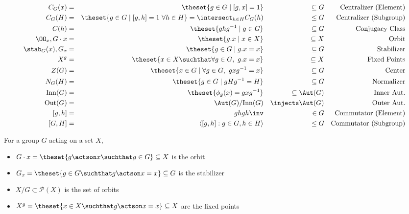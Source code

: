 \begin{align*}
C_G(x)          =       &&  \theset{g\in G \mid [g, x] = 1}                 &&  \subseteq G       &&  \text{Centralizer (Element)} \\
C_G(H)          =       &&  \theset{g\in G \mid [g, h] = 1 ~\forall h\in H} = \intersect_{h\in H} C_G(h)                 &&  \leq G       &&  \text{Centralizer (Subgroup)} \\
C(h)        =       &&  \theset{ghg^{-1} \mid g\in G}                     &&  \subseteq G       &&  \text{Conjugacy Class} \\
\OO_x, G\cdot x             =       &&  \theset{g.x \mid x\in X}                          &&  \subseteq X       &&  \text{Orbit} \\
\stab_G(x),  G_x            =       &&  \theset{g\in G \mid g.x = x}                      &&  \subseteq G       &&  \text{Stabilizer} \\
X^{g} = && \theset{x\in X \suchthat \forall g\in G,~ g.x = x} && \subseteq X && \text{Fixed Points} \\
Z(G)            =       &&  \theset{x\in G \mid \forall g\in G,~ gxg^{-1} = x} &&  \subseteq G       &&  \text{Center} \\
N_G(H)          =       &&  \theset{g\in G \mid gHg^{-1} = H}                  &&  \subseteq G       &&  \text{Normalizer} \\
\mathrm{Inn}(G) = &&  \theset{\phi_g(x) = gxg^{-1} }                 &&  \subseteq \Aut(G) &&  \text{Inner Aut.} \\
\mathrm{Out}(G) = &&  \Aut(G) / \mathrm{Inn}(G)                      &&  \injects \Aut(G)  &&  \text{Outer Aut.} \\
[g, h] = &&  ghgh\inv                      &&  \in G  &&  \text{Commutator (Element)} \\
[G, H] = && \left\langle [g,h] : g\in G, h\in H\right\rangle  &&  \leq G  &&  \text{Commutator (Subgroup)} \\
\end{align*}

For a group \(G\) acting on a set \(X\),

\begin{itemize}
\item
  \(G\cdot x = \theset{g\actson x \suchthat g\in G} \subseteq X\) is the
  orbit
\item
  \(G_x = \theset{g\in G \suchthat g\actson x = x} \subseteq G\) is the
  stabilizer
\item
  \(X/G \subset \mathcal P(X)\) is the set of orbits
\item
  \(X^g = \theset{x\in X \suchthat g\actson x = x} \subseteq X\) are the
  fixed points
\end{itemize}

